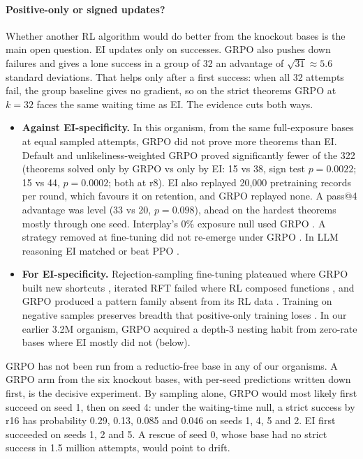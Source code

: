 \paragraph{Positive-only or signed updates?} Whether another RL algorithm would do better from the knockout bases is the
main open question. EI updates only on successes. GRPO also pushes down failures and gives a lone success in a group of
32 an advantage of $\sqrt{31} \approx 5.6$ standard deviations. That helps only after a first success: when all 32
attempts fail, the group baseline gives no gradient, so on the strict theorems GRPO at $k=32$ faces the same waiting time
as EI. The evidence cuts both ways.
\begin{itemize}
\item \textbf{Against EI-specificity.} In this organism, from the same full-exposure bases at equal sampled attempts,
GRPO did not prove more theorems than EI. Default and unlikeliness-weighted GRPO proved significantly fewer of the 322
(theorems solved only by GRPO vs only by EI: 15 vs 38, sign test $p = 0.0022$; 15 vs 44, $p = 0.0002$; both at r8).
EI also replayed 20,000 pretraining records per round, which favours it on retention, and GRPO replayed none. A pass@4
advantage was level (33 vs 20, $p = 0.098$), ahead on the hardest theorems mostly through one seed. Interplay's 0\%
exposure null used GRPO \citep{zhang2025interplay}. A strategy removed at fine-tuning did not re-emerge under GRPO
\citep{krishnamurthy2026select}. In LLM reasoning EI matched or beat PPO \citep{havrilla2024teaching}.
\item \textbf{For EI-specificity.} Rejection-sampling fine-tuning plateaued where GRPO built new shortcuts
\citep{abdulsalam2026rewrite}, iterated RFT failed where RL composed functions \citep{yuan2025fgx}, and GRPO produced a
pattern family absent from its RL data \citep{park2025countdown}. Training on negative samples preserves breadth that
positive-only training loses \citep{zhu2025nsr}. In our earlier 3.2M organism, GRPO acquired a depth-3 nesting habit from
zero-rate bases where EI mostly did not (below).
\end{itemize}
GRPO has not been run from a reductio-free base in any of our organisms. A GRPO arm from the six knockout bases, with per-seed
predictions written down first, is the decisive experiment. By sampling alone, GRPO would most likely first succeed on
seed 1, then on seed 4: under the waiting-time null, a strict success by r16 has probability 0.29, 0.13, 0.085 and 0.046
on seeds 1, 4, 5 and 2. EI first succeeded on seeds 1, 2 and 5. A rescue of seed 0, whose base had no strict success in 1.5 million attempts, would point to
drift.

